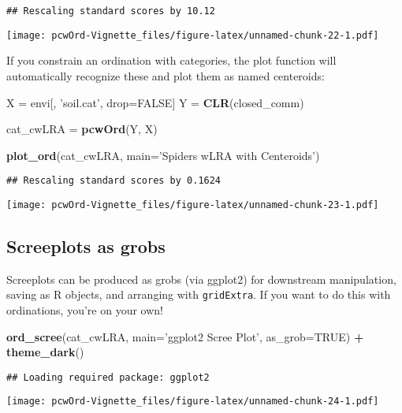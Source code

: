 \documentclass[
]{article}
\newenvironment{Shaded}{\begin{snugshade}}{\end{snugshade}}
\newcommand{\DataTypeTok}[1]{\textcolor[rgb]{0.13,0.29,0.53}{#1}}
\newcommand{\KeywordTok}[1]{\textcolor[rgb]{0.13,0.29,0.53}{\textbf{#1}}}
\newcommand{\NormalTok}[1]{#1}
\newcommand{\OperatorTok}[1]{\textcolor[rgb]{0.81,0.36,0.00}{\textbf{#1}}}
\newcommand{\OtherTok}[1]{\textcolor[rgb]{0.56,0.35,0.01}{#1}}
\newcommand{\StringTok}[1]{\textcolor[rgb]{0.31,0.60,0.02}{#1}}
\begin{document}
\begin{verbatim}
## Rescaling standard scores by 10.12
\end{verbatim}

\texttt{[image: pcwOrd-Vignette\_files/figure-latex/unnamed-chunk-22-1.pdf]}

If you constrain an ordination with categories, the plot function will
automatically recognize these and plot them as named centeroids:

\begin{Shaded}
\begin{Highlighting}[]
\NormalTok{X =}\StringTok{ }\NormalTok{envi[, }\StringTok{'soil.cat'}\NormalTok{, drop=}\OtherTok{FALSE}\NormalTok{]}
\NormalTok{Y =}\StringTok{ }\KeywordTok{CLR}\NormalTok{(closed_comm)}

\NormalTok{cat_cwLRA =}\StringTok{ }\KeywordTok{pcwOrd}\NormalTok{(Y, X)}

\KeywordTok{plot_ord}\NormalTok{(cat_cwLRA, }
         \DataTypeTok{main=}\StringTok{'Spiders wLRA with Centeroids'}\NormalTok{)}
\end{Highlighting}
\end{Shaded}

\begin{verbatim}
## Rescaling standard scores by 0.1624
\end{verbatim}

\texttt{[image: pcwOrd-Vignette\_files/figure-latex/unnamed-chunk-23-1.pdf]}

\hypertarget{screeplots-as-grobs}{%
\subsection{Screeplots as grobs}\label{screeplots-as-grobs}}

Screeplots can be produced as grobs (via ggplot2) for downstream
manipulation, saving as R objects, and arranging with
\texttt{gridExtra}. If you want to do this with ordinations, you're on
your own!

\begin{Shaded}
\begin{Highlighting}[]
\KeywordTok{ord_scree}\NormalTok{(cat_cwLRA, }\DataTypeTok{main=}\StringTok{'ggplot2 Scree Plot'}\NormalTok{, }\DataTypeTok{as_grob=}\OtherTok{TRUE}\NormalTok{) }\OperatorTok{+}\StringTok{ }
\StringTok{  }\KeywordTok{theme_dark}\NormalTok{()}
\end{Highlighting}
\end{Shaded}

\begin{verbatim}
## Loading required package: ggplot2
\end{verbatim}

\texttt{[image: pcwOrd-Vignette\_files/figure-latex/unnamed-chunk-24-1.pdf]}
\end{document}
